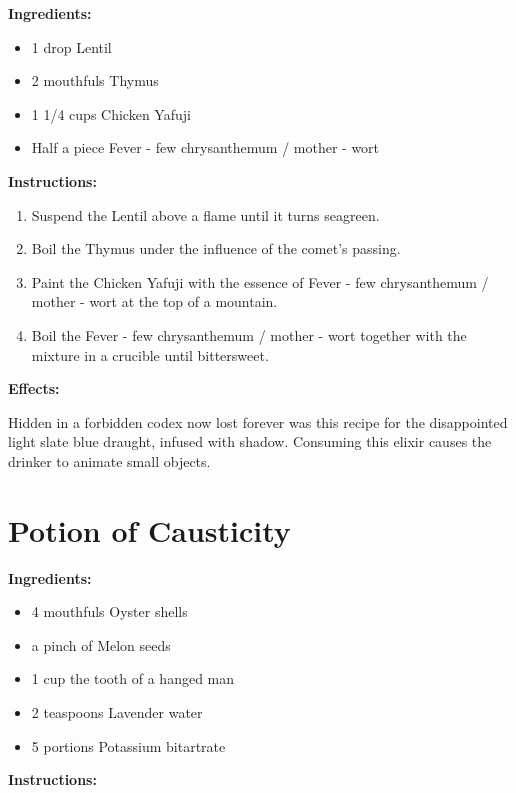 \documentclass{article}
\begin{document}
\textbf{Ingredients:}

\begin{itemize}
  \item 1 drop Lentil
  \item 2 mouthfuls Thymus
  \item 1 1/4 cups Chicken Yafuji
  \item Half a piece Fever - few chrysanthemum / mother - wort
\end{itemize}

\textbf{Instructions:}

\begin{enumerate}
  \item Suspend the Lentil above a flame until it turns seagreen.
  \item Boil the Thymus under the influence of the comet’s passing.
  \item Paint the Chicken Yafuji with the essence of Fever - few chrysanthemum / mother - wort at the top of a mountain.
  \item Boil the Fever - few chrysanthemum / mother - wort together with the mixture in a crucible until bittersweet.
\end{enumerate}

\textbf{Effects:}

Hidden in a forbidden codex now lost forever was this recipe for the disappointed light slate blue draught, infused with shadow. Consuming this elixir causes the drinker to animate small objects.

\newpage
\section*{Potion of Causticity}

\textbf{Ingredients:}

\begin{itemize}
  \item 4 mouthfuls Oyster shells
  \item a pinch of Melon seeds
  \item 1 cup the tooth of a hanged man
  \item 2 teaspoons Lavender water
  \item 5 portions Potassium bitartrate
\end{itemize}

\textbf{Instructions:}
\end{document}

